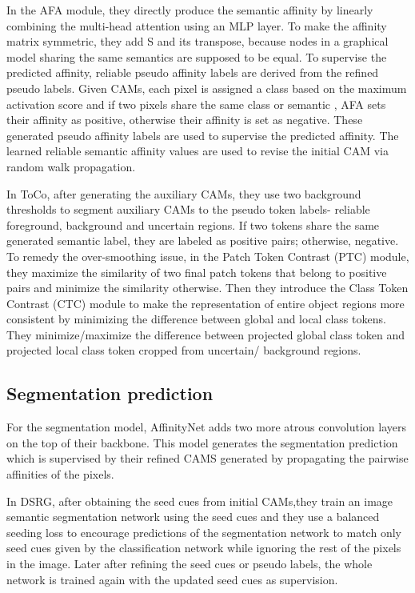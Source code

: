 In the AFA module, they directly produce the semantic affinity by linearly combining the multi-head attention using an MLP layer. To make the affinity matrix symmetric, they add S and its transpose, because  nodes in a graphical model sharing the same semantics are supposed to be equal. To supervise the predicted affinity, reliable pseudo affinity labels  are derived from the refined pseudo labels. Given CAMs, each pixel is assigned a class based on the maximum activation score and if two pixels share the same class or semantic , AFA sets their affinity as positive, otherwise their affinity is set as negative. These generated pseudo affinity labels are used to supervise the predicted affinity. The learned reliable semantic affinity values are used to revise the initial CAM via random walk propagation.

In ToCo, after generating the auxiliary CAMs, they use two background thresholds to segment auxiliary CAMs to the pseudo token labels- reliable foreground, background and uncertain regions. If two tokens share the same generated semantic label, they are labeled as positive pairs; otherwise, negative. To remedy the over-smoothing issue, in the Patch Token Contrast (PTC) module, they maximize the similarity of two final patch tokens that belong to positive pairs and minimize the similarity otherwise. Then they introduce the Class Token Contrast (CTC) module to make the representation of entire object regions more consistent by minimizing the difference between global and local class tokens. They minimize/maximize the difference between projected global class token and projected local class token cropped from uncertain/ background regions. 


\subsection{Segmentation prediction}
\label{subsec:segmentation-prediction}

For the segmentation model, AffinityNet adds two more atrous convolution layers on the top of their backbone. This model generates the segmentation prediction which is supervised by their refined CAMS generated by propagating the pairwise affinities of the pixels.

In DSRG, after obtaining the seed cues from initial CAMs,they train an image semantic segmentation network using the seed cues and they use a balanced seeding loss to encourage predictions of the segmentation network to match only seed cues given by the classification network while ignoring the rest of the pixels in the image. Later after refining the seed cues or pseudo labels, the whole network is trained again with the updated seed cues as supervision.

